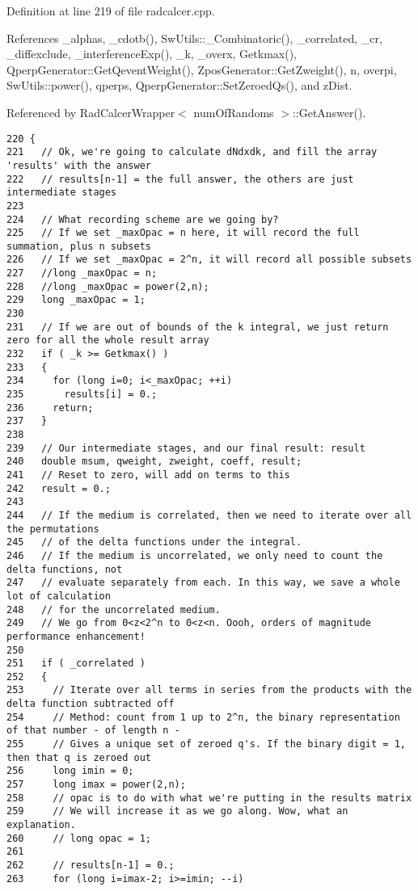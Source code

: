 Definition at line 219 of file radcalcer.cpp.

References \_\-alphas, \_\-cdotb(), SwUtils::\_\-Combinatoric(), \_\-correlated, \_\-cr, \_\-diffexclude, \_\-interferenceExp(), \_\-k, \_\-overx, Getkmax(), QperpGenerator::GetQeventWeight(), ZposGenerator::GetZweight(), n, overpi, SwUtils::power(), qperps, QperpGenerator::SetZeroedQs(), and zDist.

Referenced by RadCalcerWrapper$<$ numOfRandoms $>$::GetAnswer().

\begin{Code}\begin{verbatim}220 {
221   // Ok, we're going to calculate dNdxdk, and fill the array 'results' with the answer
222   // results[n-1] = the full answer, the others are just intermediate stages
223 
224   // What recording scheme are we going by?
225   // If we set _maxOpac = n here, it will record the full summation, plus n subsets
226   // If we set _maxOpac = 2^n, it will record all possible subsets
227   //long _maxOpac = n;
228   //long _maxOpac = power(2,n);
229   long _maxOpac = 1;
230 
231   // If we are out of bounds of the k integral, we just return zero for all the whole result array
232   if ( _k >= Getkmax() )
233   {
234     for (long i=0; i<_maxOpac; ++i)
235       results[i] = 0.;
236     return;
237   }
238 
239   // Our intermediate stages, and our final result: result
240   double msum, qweight, zweight, coeff, result;
241   // Reset to zero, will add on terms to this
242   result = 0.;
243 
244   // If the medium is correlated, then we need to iterate over all the permutations
245   // of the delta functions under the integral.
246   // If the medium is uncorrelated, we only need to count the delta functions, not 
247   // evaluate separately from each. In this way, we save a whole lot of calculation
248   // for the uncorrelated medium.
249   // We go from 0<z<2^n to 0<z<n. Oooh, orders of magnitude performance enhancement!  
250 
251   if ( _correlated )
252   {
253     // Iterate over all terms in series from the products with the delta function subtracted off
254     // Method: count from 1 up to 2^n, the binary representation of that number - of length n -
255     // Gives a unique set of zeroed q's. If the binary digit = 1, then that q is zeroed out
256     long imin = 0;
257     long imax = power(2,n);
258     // opac is to do with what we're putting in the results matrix
259     // We will increase it as we go along. Wow, what an explanation.
260     // long opac = 1;
261 
262     // results[n-1] = 0.;
263     for (long i=imax-2; i>=imin; --i)

\end{verbatim}
\end{Code}
